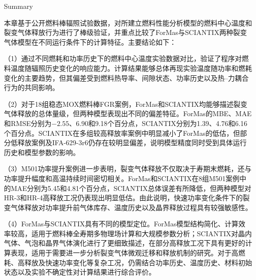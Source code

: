 {Summary}

本章基于公开燃料棒辐照试验数据，对所建立燃料性能分析模型的燃料中心温度和裂变气体释放行为进行了棒级验证，并重点比较了ForMas与SCIANTIX两种裂变气体模型在不同运行条件下的计算特征。主要结论如下：

（1）通过不同燃耗和功率历史下的燃料中心温度实验数据对比，验证了程序对燃料温度随辐照历史变化的响应能力。计算结果能够总体再现实验温度随功率和燃耗变化的主要趋势，但其偏差受到燃料热导率、间隙状态、功率历史以及热--力耦合行为的共同影响。

（2）对于18组稳态MOX燃料棒FGR案例，ForMas和SCIANTIX均能够描述裂变气体释放的总体量级，但两种模型表现出不同的偏差特征。ForMas的MBE、MAE和RMSE分别为$-2.55$、6.90和9.18个百分点，SCIANTIX分别为1.39、4.76和6.16个百分点。SCIANTIX在多组较高释放率案例中明显减小了ForMas的低估，但部分低释放案例及IFA-629-3r6仍存在较明显偏差，说明模型精度同时受到具体运行历史和模型参数的影响。

（3）M501功率提升案例进一步表明，裂变气体释放不仅取决于寿期末燃耗，还与功率提升幅度和高温持续时间密切相关。ForMas和SCIANTIX在8组M501案例中的MAE分别为5.45和4.81个百分点，SCIANTIX总体误差有所降低，但两种模型对HR-3和HR-4高释放工况仍表现出明显低估。由此说明，快速功率变化条件下的裂变气体释放对功率提升前气体库存、温度历史以及晶界释放过程具有较强敏感性。

（4）ForMas与SCIANTIX具有不同的模型定位。ForMas模型结构简化、计算效率较高，适用于燃料棒全寿期多物理场计算和大规模参数分析；SCIANTIX对晶内气体、气泡和晶界气体演化进行了更细致描述，在部分高释放工况下具有更好的计算表现，适用于需要进一步分析裂变气体微观迁移和释放机制的研究。对于高燃耗、高释放及快速功率变化等复杂工况，仍需结合功率历史、温度历史、材料初始状态以及实验不确定性对计算结果进行综合评价。